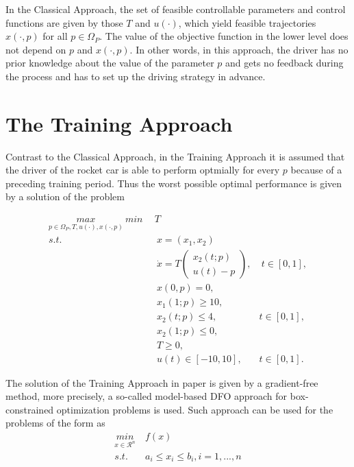 In the Classical Approach, the set of feasible controllable parameters and control functions are given by those $T$ and $u(\cdot)$, which yield feasible trajectories $x(\cdot, p)$ for all $p \in \Omega_P$. The value of the objective function in the lower level does not depend on $p$ and $x(\cdot, p)$. In other words, in this approach, the driver has no prior knowledge about the value of the parameter $p$ and gets no feedback during the process and has to set up the driving strategy in advance. 



\section{The Training Approach}
Contrast to the Classical Approach, in the Training Approach it is assumed that the driver of the rocket car is able to perform optmially for every $p$ because of a preceding training period. Thus the worst possible optimal performance is given by a solution of the problem

\begin{subequations}
	\begin{align}
	   \underset{p \in \Omega_P, T, u(\cdot), x(\cdot,p)}{max}  \ 	\underset{}{min} \   & \  T \\ 
		s.t.  & \ \ x = (x_1, x_2)   \label{ta_rc_x} \\ 
             & \ \  \dot{x} = T  \begin{pmatrix}  x_2(t;p) \\ u(t)-p   \end{pmatrix}, & \ t \in [0,1],  \label{ta_rc_partial} \\
& \ \ x(0,p) = 0, \label{ta_rc_t0}\\
& \ \ x_1(1;p) \geq 10, \label{ta_rc_x1_t1} \\
& \ \ x_2(t;p) \leq 4, & t \in [0,1], \label{ta_rc_x2_tc} \\
& \ \ x_2(1;p) \leq 0, \label{ta_rc_x2_t1}  \\
& \ \ T \geq 0, \\
& \ \ u(t) \in [-10, 10], & t \in [0,1]. 
	\end{align}
	\label{TA_rc}
\end{subequations}

The solution of the Training Approach in paper \cite{MatSch22} is given by a gradient-free method, more precisely, a so-called model-based DFO approach for box-constrained optimization problems is used. Such approach can be used for the problems of the form as 
\begin{equation}
	\begin{aligned}
		\underset{x \in \mathcal{R}^n}{min} & \  f(x)  \\ 
		s.t.  & \ a_i \leq x_i \leq b_i, i = 1, ..., n \\
	\end{aligned}
	\label{DFO_bc}
\end{equation}


